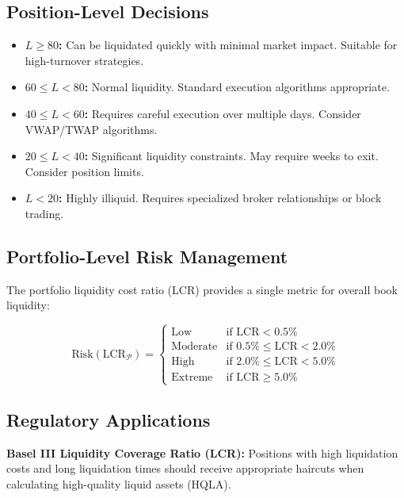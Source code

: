 \documentclass[11pt,a4paper]{article}
\begin{document}
\subsection{Position-Level Decisions}

\begin{itemize}
    \item \textbf{$L \geq 80$:} Can be liquidated quickly with minimal market impact. Suitable for high-turnover strategies.
    \item \textbf{$60 \leq L < 80$:} Normal liquidity. Standard execution algorithms appropriate.
    \item \textbf{$40 \leq L < 60$:} Requires careful execution over multiple days. Consider VWAP/TWAP algorithms.
    \item \textbf{$20 \leq L < 40$:} Significant liquidity constraints. May require weeks to exit. Consider position limits.
    \item \textbf{$L < 20$:} Highly illiquid. Requires specialized broker relationships or block trading.
\end{itemize}

\subsection{Portfolio-Level Risk Management}

The portfolio liquidity cost ratio (LCR) provides a single metric for overall book liquidity:

\begin{equation}
\text{Risk}(\text{LCR}_{\mathcal{P}}) = \begin{cases}
\text{Low} & \text{if LCR} < 0.5\% \\
\text{Moderate} & \text{if } 0.5\% \leq \text{LCR} < 2.0\% \\
\text{High} & \text{if } 2.0\% \leq \text{LCR} < 5.0\% \\
\text{Extreme} & \text{if LCR} \geq 5.0\%
\end{cases}
\end{equation}

\subsection{Regulatory Applications}

\textbf{Basel III Liquidity Coverage Ratio (LCR):}
Positions with high liquidation costs and long liquidation times should receive appropriate haircuts when calculating high-quality liquid assets (HQLA).
\end{document}
